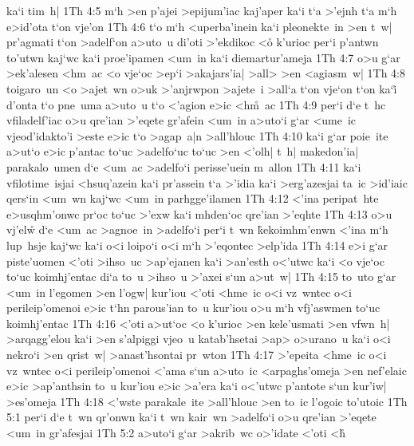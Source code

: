 ka`i
tim~h|\bibvsend
\vs 1Th 4:5
m`h
>en
p'ajei
>epijum'iac
kaj'aper
ka`i
t`a
>'ejnh
t`a
m`h
e>id'ota
t`on
vje'on\bibvsend
\vs 1Th 4:6
t`o
m`h
<uperba'inein
ka`i
pleonekte~in
>en
t~w|
pr'agmati
t`on
>adelf`on
a>uto~u
di'oti
>'ekdikoc
<o\r{}
k'urioc
per`i
p'antwn
to'utwn
kaj`wc
ka`i
proe'ipamen
<um~in
ka`i
diemartur'ameja\bibvsend
\vs 1Th 4:7
o>u
g`ar
>ek'alesen
<hm~ac
<o
vje`oc
>ep`i
>akajars'ia|
>all>
>en
<agiasm~w|\bibvsend
\vs 1Th 4:8
toigaro~un
<o
>ajet~wn
o>uk
>'anjrwpon
>ajete~i
>all`a
t`on
vje`on
t`on
ka`i\r{}
d'onta
t`o
pne~uma
a>uto~u
t`o
<'agion
e>ic
<h\r{m}~ac\bibvsend
{}
\vs 1Th 4:9
per`i
d`e
t~hc
vfiladelf'iac
o>u
qre'ian
>'eqete
gr'afein
<um~in
a>uto`i
g`ar
<ume~ic
vjeod'idakto'i
>este
e>ic
t`o
>agap~a|n
>all'hlouc\bibvsend
\vs 1Th 4:10
ka`i
g`ar
poie~ite
a>ut`o
e>ic
p'antac
to`uc
>adelfo`uc
to`uc
>en
<'olh|
t~h|
makedon'ia|
parakalo~umen
d`e
<um~ac
>adelfo`i
perisse'uein
m~allon\bibvsend
\vs 1Th 4:11
ka`i
vfilotime~isjai
<hsuq'azein
ka`i
pr'assein
t`a
>'idia
ka`i
>erg'azesjai
ta~ic
>id'iaic
qers`in
<um~wn
kaj`wc
<um~in
parhgge'ilamen\bibvsend
\vs 1Th 4:12
<'ina
peripat~hte
e>usqhm'onwc
pr`oc
to`uc
>'exw
ka`i
mhden`oc
qre'ian
>'eqhte\bibvsend
\vs 1Th 4:13
o>u
vj'el\r{w}
d`e
<um~ac
>agnoe~in
>adelfo`i
per`i
t~wn
\r{k}ekoimhm'enwn
<'ina
m`h
lup~hsje
kaj`wc
ka`i
o<i
loipo`i
o<i
m`h
>'eqontec
>elp'ida\bibvsend
\vs 1Th 4:14
e>i
g`ar
piste'uomen
<'oti
>ihso~uc
>ap'ejanen
ka`i
>an'esth
o<'utwc
ka`i
<o
vje`oc
to`uc
koimhj'entac
di`a
to~u
>ihso~u
>'axei
s`un
a>ut~w|\bibvsend
\vs 1Th 4:15
to~uto
g`ar
<um~in
l'egomen
>en
l'ogw|
kur'iou
<'oti
<hme~ic
o<i
vz~wntec
o<i
perileip'omenoi
e>ic
t`hn
parous'ian
to~u
kur'iou
o>u
m`h
vfj'aswmen
to`uc
koimhj'entac\bibvsend
\vs 1Th 4:16
<'oti
a>ut`oc
<o
k'urioc
>en
kele'usmati
>en
vfwn~h|
>arqagg'elou
ka`i
>en
s'alpiggi
vjeo~u
katab'hsetai
>ap>
o>urano~u
ka`i
o<i
nekro`i
>en
qrist~w|
>anast'hsontai
pr~wton\bibvsend
\vs 1Th 4:17
>'epeita
<hme~ic
o<i
vz~wntec
o<i
perileip'omenoi
<'ama
s`un
a>uto~ic
<arpaghs'omeja
>en
nef'elaic
e>ic
>ap'anthsin
to~u
kur'iou
e>ic
>a'era
ka`i
o<'utwc
p'antote
s`un
kur'iw|
>es'omeja\bibvsend
\vs 1Th 4:18
<'wste
parakale~ite
>all'hlouc
>en
to~ic
l'ogoic
to'utoic\bibvsend
\vs 1Th 5:1
per`i
d`e
t~wn
qr'onwn
ka`i
t~wn
kair~wn
>adelfo`i
o>u
qre'ian
>'eqete
<um~in
gr'afesjai\bibvsend
\vs 1Th 5:2
a>uto`i
g`ar
>akrib~wc
o>'idate
<'oti
<h\r{}
